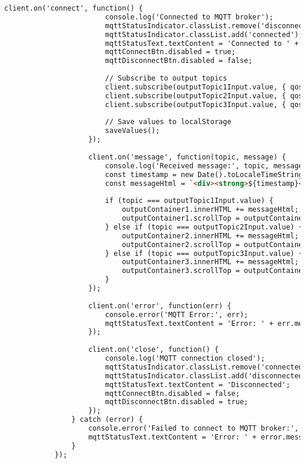 \begin{lstlisting}[language=html]
                    client.on('connect', function() {
                        console.log('Connected to MQTT broker');
                        mqttStatusIndicator.classList.remove('disconnected');
                        mqttStatusIndicator.classList.add('connected');
                        mqttStatusText.textContent = 'Connected to ' + broker;
                        mqttConnectBtn.disabled = true;
                        mqttDisconnectBtn.disabled = false;
                        
                        // Subscribe to output topics
                        client.subscribe(outputTopic1Input.value, { qos: 0 });
                        client.subscribe(outputTopic2Input.value, { qos: 0 });
                        client.subscribe(outputTopic3Input.value, { qos: 0 });
                        
                        // Save values to localStorage
                        saveValues();
                    });
                    
                    client.on('message', function(topic, message) {
                        console.log('Received message:', topic, message.toString());
                        const timestamp = new Date().toLocaleTimeString();
                        const messageHtml = `<div><strong>${timestamp}</strong>: ${message.toString()}</div>`;
                        
                        if (topic === outputTopic1Input.value) {
                            outputContainer1.innerHTML += messageHtml;
                            outputContainer1.scrollTop = outputContainer1.scrollHeight;
                        } else if (topic === outputTopic2Input.value) {
                            outputContainer2.innerHTML += messageHtml;
                            outputContainer2.scrollTop = outputContainer2.scrollHeight;
                        } else if (topic === outputTopic3Input.value) {
                            outputContainer3.innerHTML += messageHtml;
                            outputContainer3.scrollTop = outputContainer3.scrollHeight;
                        }
                    });
                    
                    client.on('error', function(err) {
                        console.error('MQTT Error:', err);
                        mqttStatusText.textContent = 'Error: ' + err.message;
                    });
                    
                    client.on('close', function() {
                        console.log('MQTT connection closed');
                        mqttStatusIndicator.classList.remove('connected');
                        mqttStatusIndicator.classList.add('disconnected');
                        mqttStatusText.textContent = 'Disconnected';
                        mqttConnectBtn.disabled = false;
                        mqttDisconnectBtn.disabled = true;
                    });
                } catch (error) {
                    console.error('Failed to connect to MQTT broker:', error);
                    mqttStatusText.textContent = 'Error: ' + error.message;
                }
            });
    

\end{lstlisting}
